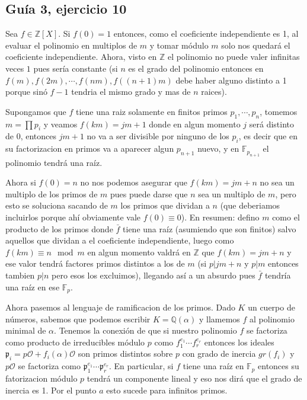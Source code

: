 \documentclass[12pt]{amsart}
\newcommand{\QQ}{\mathbb{Q}}
\newcommand{\ZZ}{\mathbb{Z}}
\newcommand{\FF}{\mathbb{F}}
\newcommand{\pp}{\mathfrak{p}}
\newcommand{\OO}{\mathcal{O}}
\theoremstyle{plain}
\begin{document}
\subsection*{Guía 3, ejercicio 10}

Sea $f\in \ZZ[X]$. Si $f(0)=1$ entonces, como el coeficiente 
independiente es 1, al evaluar el polinomio en multiplos de $m$ y 
tomar módulo $m$ solo nos quedará el coeficiente independiente. Ahora,
visto en $\ZZ$ el polinomio no puede valer infinitas veces $1$ pues 
sería constante (si $n$ es el grado del polinomio entonces en $f(m), 
f(2m), \cdots, f(nm), f((n+1)m)$ debe haber alguno distinto a 1 
porque sinó $f-1$ tendria el mismo grado y mas de $n$ raices). 

Supongamos que $f$ tiene una raiz solamente en finitos primos $p_1,
\cdots, p_n$, tomemos $m=\prod p_i$ y veamos $f(km) = jm+1$ donde en
algun momento $j$ será distinto de 0, entonces $jm+1$ no va a ser 
divisible por ninguno de los $p_i$, es decir que en su factorizacion 
en primos va a aparecer algun $p_{n+1}$ nuevo, y en $\FF_{p_{n+1}}$
el polinomio tendrá una raíz.

Ahora si $f(0) = n$ no nos podemos asegurar que $f(km) = jm+n$ no 
sea un multiplo de los primos de $m$ pues puede darse que $n$ sea un
multiplo de $m$, pero esto se soluciona sacando de $m$ los primos que 
dividan a $n$ (que deberiamos incluirlos porque ahí obviamente vale 
$f(0)\equiv 0$). En resumen: defino $m$ como el producto de los primos
donde $\bar{f}$ tiene una raíz (asumiendo que son finitos) salvo 
aquellos que dividan a el coeficiente independiente, luego como 
$f(km) \equiv n \mod m$ en algun momento valdrá en $\ZZ$ que 
$f(km) = jm+n$ y ese valor tendrá factores primos distintos a los de 
$m$ (si $p|jm+n$ y $p|m$ entonces tambien $p|n$ pero esos los 
excluimos), llegando así a un absurdo pues $\bar{f}$ tendría una raíz 
en ese $\FF_p$.

Ahora pasemos al lenguaje de ramificacion de los primos. Dado $K$ un cuerpo de 
números, sabemos que podemos escribir $K=\QQ(\alpha)$ y llamemos $f$ al
polinomio minimal de $\alpha$. Tenemos la
conexión de que si nuestro polinomio $f$ se factoriza como 
producto de irreducibles módulo $p$ como $f_1^{e_1}\cdots f_r^{e_r}$ 
entonces los ideales $\pp_i = p\OO + f_i(\alpha)\OO$ son primos distintos
sobre $p$ con grado de inercia $gr(f_i)$ y $p\OO$ se factoriza como
$\pp_1^{e_1}\cdots \pp_r^{e_r}$. En particular, si $f$ tiene una raíz 
en $\FF_p$ entonces su fatorizacion módulo $p$ tendrá un componente 
lineal y eso nos dirá que el grado de inercia es 1. Por el punto $a$ esto
sucede para infinitos primos.
\end{document}
